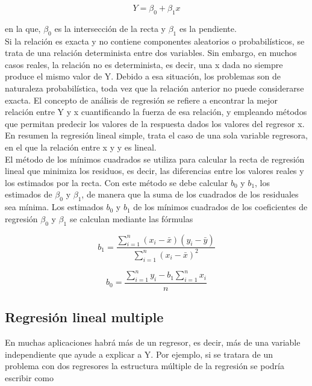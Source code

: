\documentclass[conference]{IEEEtran}
\begin{document}
\begin{equation}
Y= \beta_0 + \beta_1x
\end{equation}

en la que, $\beta_0$ es la intersección de la recta y $\beta_1$ es la pendiente.\\

Si la relación es exacta y no contiene componentes aleatorios o probabilísticos, se trata de una relación determinista entre dos variables. Sin embargo, en muchos casos reales, la relación no es determinista, es decir, una x dada no siempre produce el mismo valor de Y. Debido a esa situación, los problemas son de naturaleza probabilística, toda vez que la relación anterior no puede considerarse exacta. El concepto de análisis de regresión se refiere a encontrar la mejor relación entre Y y x cuantificando la fuerza de esa relación, y empleando métodos que permitan predecir los valores de la respuesta dados los valores del regresor x. En resumen la regresión lineal simple, trata el caso de una sola variable regresora, en el que la relación entre x y y es lineal.\\

El método de los mínimos cuadrados se utiliza para calcular la recta de regresión lineal que minimiza los residuos, es decir, las diferencias entre los valores reales y los estimados por la recta. Con este método se debe calcular $b_0$ y $b_1$, los estimados de $\beta_0$ y $\beta_1$, de manera que la suma de los cuadrados de los residuales sea mínima. Los estimados $b_0$ y $b_1$ de los mínimos cuadrados de los coeficientes de regresión $\beta_0$ y $\beta_1$ se calculan mediante las fórmulas

\begin{equation}
b_1= \frac{\sum_{i=1}^{n}(x_i-\bar{x})(y_i-\bar{y})}{\sum_{i=1}^{n}(x_i-\bar{x})^{2}}
\end{equation}

\begin{equation}
b_0= \frac{\sum_{i=1}^{n} y_i - b_1 \sum_{i=1}^{n}x_i}{n}
\end{equation}

\subsection{Regresión lineal multiple}
En muchas aplicaciones habrá más de un regresor, es decir, más de una variable independiente que ayude a explicar a Y. Por ejemplo, si se tratara de un problema con dos regresores la estructura múltiple de la regresión se podría escribir como
\end{document}
